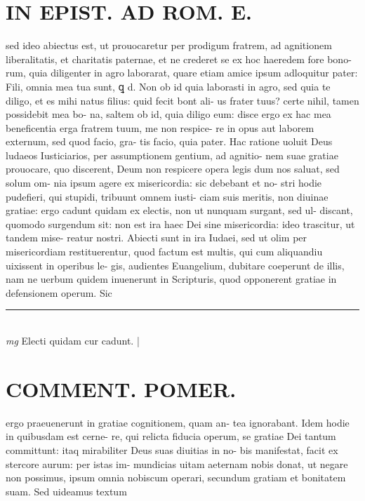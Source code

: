 \documentclass{article}
\begin{document}
\begin{pages}
\section*{IN EPIST. AD ROM.  E. }
\marginpar{[ p.]}\pstart sed ideo abiectus est, ut prouocaretur per prodigum fratrem, ad agnitionem liberalitatis, et charitatis paternae, et ne crederet se ex hoc haeredem fore bono- rum, quia diligenter in agro laborarat, quare etiam amice ipsum adloquitur pater: Fili, omnia mea tua sunt, ꝗ d. Non ob id quia laborasti in agro, sed quia te diligo, et es mihi natus filius: quid fecit bont ali- us frater tuus? certe nihil, tamen possidebit mea bo- na, saltem ob id, quia diligo eum: disce ergo ex hac mea beneficentia erga fratrem tuum, me non respice- re in opus aut laborem externum, sed quod facio, gra- tis facio, quia pater. Hac ratione uoluit Deus ludaeos Iusticiarios, per assumptionem gentium, ad agnitio- nem suae gratiae prouocare, quo discerent, Deum non respicere opera legis dum nos saluat, sed solum om- nia ipsum agere ex misericordia: sic debebant et no- stri hodie pudefieri, qui stupidi, tribuunt omnem iusti- ciam suis meritis, non diuinae gratiae: ergo cadunt quidam ex electis, non ut nunquam surgant, sed ul- discant, quomodo surgendum sit: non est ira haec Dei sine misericordia: ideo trascitur, ut tandem mise- reatur nostri. Abiecti sunt in ira Iudaei, sed ut olim per misericordiam restituerentur, quod factum est multis, qui cum aliquandiu uixissent in operibus le- gis, audientes Euangelium, dubitare coeperunt de illis, nam ne uerbum quidem inuenerunt in Scripturis, quod opponerent gratiae in defensionem operum. Sic  \pend
\vspace{0.5cm}\noindent
\vspace{0.2cm}\rule{1cm}{0.2pt}\\ 
\hspace{0.2cm}\textit{mg}
\footnotesize Electi quidam cur cadunt.  
\normalsize| 
\section*{COMMENT. POMER.  }\pstart ergo praeuenerunt in gratiae cognitionem, quam an- tea ignorabant. Idem hodie in quibusdam est cerne- re, qui relicta fiducia operum, se gratiae Dei tantum committunt: itaq mirabiliter Deus suas diuitias in no- bis manifestat, facit ex stercore aurum: per istas im- mundicias uitam aeternam nobis donat, ut negare non possimus, ipsum omnia nobiscum operari, secundum gratiam et bonitatem suam. Sed uideamus textum  \pend
{}
{}

\end{pages}
\end{document}
